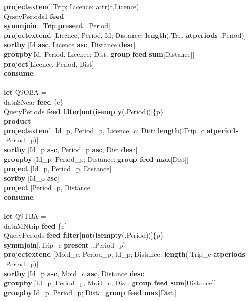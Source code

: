 \documentclass[a4paper]{article}
\newcommand{\op}[1]{\textbf{#1}}
\begin{document}
\begin{scriptsize}
\begin{tabbing}
\>\>\>\op{projectextend}[Trip; Licence: attr(t,Licence)]]\\
\>QueryPeriods1 \op{feed}\\
\>\op{symmjoin} [.Trip \op{present} ..Period]\\
\>\op{projectextend} [Licence, Period, Id; Distance: \op{length}(.Trip
\op{atperiods} .Period)]\\
\>\op{sortby} [Id \op{asc}, Licence \op{asc}, Distance \op{desc}]\\
\>\op{groupby}[Id, Period, Licence; Dist: \op{group feed sum}[Distance]]\\
\>\op{project}[Licence, Period, Dist]\\
\op{consume};\\
\\
\op{let} Q9OBA =\\
\>dataSNcar \op{feed} \{c\}\\
\>QueryPeriods \op{feed filter}[\op{not}(\op{isempty}(.Period))]\{p\}\\
\>\op{product}\\
\>\op{projectextend} [Id\_p, Period\_p, Licence\_c; Dist: \op{length}(.Trip\_c
\op{atperiods} .Period\_p)]\\
\>\op{sortby} [Id\_p \op{asc}, Period\_p \op{asc}, Dist \op{desc}]\\
\>\op{groupby} [Id\_p, Period\_p; Distance: \op{group feed max}[Dist]]\\
\>\op{project} [Id\_p, Period\_p, Distance]\\
\>\op{sortby} [Id\_p \op{asc}]\\
\>\op{project} [Period\_p, Distance]\\
\op{consume};\\
\\
\op{let} Q9TBA =\\
\>dataMNtrip \op{feed} \{c\}\\
\>QueryPeriods \op{feed filter}[\op{not}(\op{isempty}(.Period))]\{p\}\\
\>\op{symmjoin}[.Trip\_c \op{present} ..Period\_p]\\
\>\op{projectextend} [Moid\_c, Period\_p, Id\_p; Distance: \op{length}(.Trip\_c
\op{atperiods} .Period\_p)]\\
\>\op{sortby} [Id\_p \op{asc}, Moid\_c \op{asc}, Distance \op{desc}]\\
\>\op{groupby} [Id\_p, Period\_p, Moid\_c; Dist: \op{group feed
sum}[Distance]]\\
\>\op{groupby}[Id\_p, Period\_p; Dista: \op{group feed max}[Dist]]\\

\end{tabbing}
\end{scriptsize}
\end{document}
